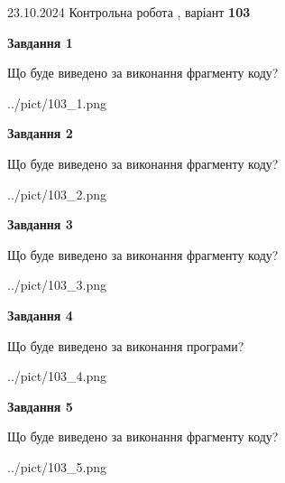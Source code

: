 \documentclass[12pt, ukrainian]{article}
\begin{document}
{\Large{23.10.2024 Контрольна робота , варіант  \No \textbf { 103 }\par}}
{
\begin {large}
{\begin {center}\textbf{Завдання 1}\end {center}}

Що буде виведено за виконання фрагменту коду?\par
\begin{center}
	{../pict/103_1.png}
\end{center}
\newpage

{\begin {center}\textbf{Завдання 2}\end {center}}

Що буде виведено за виконання фрагменту коду?\par
\begin{center}
	{../pict/103_2.png}
\end{center}
\newpage

{\begin {center}\textbf{Завдання 3}\end {center}}

Що буде виведено за виконання фрагменту коду?\par
\begin{center}
	{../pict/103_3.png}
\end{center}
\newpage

{\begin {center}\textbf{Завдання 4}\end {center}}

Що буде виведено за виконання програми?\par
\begin{center}
	{../pict/103_4.png}
\end{center}
\newpage

{\begin {center}\textbf{Завдання 5}\end {center}}

Що буде виведено за виконання фрагменту коду?\par
\begin{center}
	{../pict/103_5.png}
\end{center}
\newpage


\end{large}}
\end{document}
